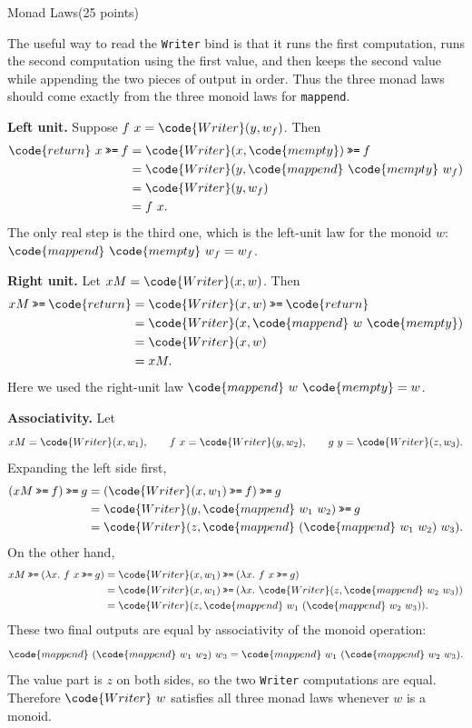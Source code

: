 \documentclass{article}
\begin{document}
\begin{question}{Monad Laws}{(25 points)}

The useful way to read the \texttt{Writer} bind is that it runs the first
computation, runs the second computation using the first value, and then
keeps the second value while appending the two pieces of output in order.
Thus the three monad laws should come exactly from the three monoid laws for
\texttt{mappend}.

\medskip
\noindent\textbf{Left unit.}
Suppose \(f~x = \code{Writer}(y,w_f)\). Then
\[
\begin{aligned}
  \code{return}\ x \bindop f
    &= \code{Writer}(x,\code{mempty}) \bindop f \\
    &= \code{Writer}(y,\code{mappend}\ \code{mempty}\ w_f) \\
    &= \code{Writer}(y,w_f) \\
    &= f~x.
\end{aligned}
\]
The only real step is the third one, which is the left-unit law for the
monoid \(w\): \(\code{mappend}\ \code{mempty}\ w_f=w_f\).

\medskip
\noindent\textbf{Right unit.}
Let \(xM=\code{Writer}(x,w)\). Then
\[
\begin{aligned}
  xM \bindop \code{return}
    &= \code{Writer}(x,w) \bindop \code{return} \\
    &= \code{Writer}(x,\code{mappend}\ w\ \code{mempty}) \\
    &= \code{Writer}(x,w) \\
    &= xM.
\end{aligned}
\]
Here we used the right-unit law
\(\code{mappend}\ w\ \code{mempty}=w\).

\medskip
\noindent\textbf{Associativity.}
Let
\[
  xM=\code{Writer}(x,w_1), \qquad
  f~x=\code{Writer}(y,w_2), \qquad
  g~y=\code{Writer}(z,w_3).
\]
Expanding the left side first,
\[
\begin{aligned}
  (xM \bindop f)\bindop g
    &= (\code{Writer}(x,w_1)\bindop f)\bindop g \\
    &= \code{Writer}(y,\code{mappend}\ w_1\ w_2)\bindop g \\
    &= \code{Writer}
        (z,\code{mappend}\ (\code{mappend}\ w_1\ w_2)\ w_3).
\end{aligned}
\]
On the other hand,
\[
\begin{aligned}
  xM \bindop (\lambda x.\ f~x\bindop g)
    &= \code{Writer}(x,w_1)\bindop(\lambda x.\ f~x\bindop g) \\
    &= \code{Writer}(x,w_1)\bindop
        (\lambda x.\ \code{Writer}
          (z,\code{mappend}\ w_2\ w_3)) \\
    &= \code{Writer}
        (z,\code{mappend}\ w_1\ (\code{mappend}\ w_2\ w_3)).
\end{aligned}
\]
These two final outputs are equal by associativity of the monoid operation:
\[
  \code{mappend}\ (\code{mappend}\ w_1\ w_2)\ w_3
  =
  \code{mappend}\ w_1\ (\code{mappend}\ w_2\ w_3).
\]
The value part is \(z\) on both sides, so the two \texttt{Writer} computations
are equal. Therefore \(\code{Writer}\ w\) satisfies all three monad laws
whenever \(w\) is a monoid.

\end{question}
\end{document}
